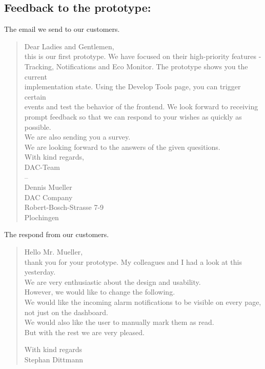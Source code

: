 \subsection{Feedback to the prototype:}
\label{sec:orgd208454}

The email we send to our customers.

\begin{verse}
	  Dear Ladies and Gentlemen,\\
	\vspace*{1em}
	this is our first prototype. We have focused on their high-priority features -\\
	Tracking, Notifications and Eco Monitor. The prototype shows you the current\\
	implementation state. Using the Develop Tools page, you can trigger certain\\
	events and test the behavior of the frontend. We look forward to receiving\\
	prompt feedback so that we can respond to your wishes as quickly as possible.\\
	\vspace*{1em}
	We are also sending you a survey. \\
	We are looking forward to the  answers of the given quesitions.\\
	\vspace*{1em}
	With kind regards,\\
	DAC-Team\\
	--\\
	Dennis Mueller\\
	\vspace*{1em}
	DAC Company\\
	Robert-Bosch-Strasse 7-9\\
	Plochingen\\
\end{verse}


The respond from our customers.
\begin{verse}
	Hello Mr. Mueller,\\
	\vspace*{1em}
	thank you for your prototype. My colleagues and I had a look at this yesterday.\\
	We are very enthusiastic about the design and usability.\\
	However, we would like to change the following.\\
	We would like the incoming alarm notifications to be visible on every page,\\
	not just on the dashboard.\\
	We would also like the user to manually mark them as read.\\
	
	But with the rest we are very pleased.
	
	\vspace*{1em}
	With kind regards\\
	Stephan Dittmann\\
\end{verse}

